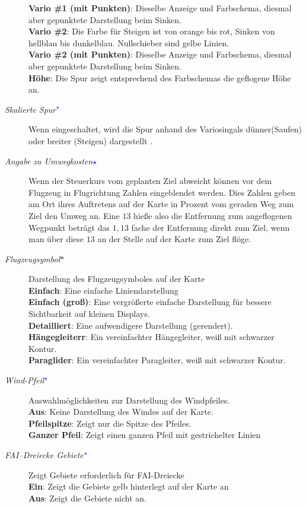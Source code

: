 \begin{description}
  {\bf Vario \#1 (mit Punkten)}: Dieselbe Anzeige und Farbschema, diesmal aber gepunktete Darstellung
beim Sinken. \\
  {\bf Vario \#2}: Die Farbe für Steigen ist von orange bis rot, Sinken von hellblau bis dunkelblau. Nullschieber sind gelbe Linien.\\
  {\bf Vario \#2 (mit Punkten)}: Dieselbe Anzeige und Farbschema, diesmal aber gepunktete Darstellung
  beim Sinken.\\
  {\bf Höhe}: Die Spur zeigt entsprechend des Farbschemas die geflogene Höhe an.
\item[\textit{Skalierte Spur$^{\textcolor{blue}{\star}}$}] \label{conf:trailscaled} Wenn eingeschaltet, wird die Spur anhand des Variosingals
dünner(Saufen) oder breiter (Steigen) dargestellt .
\item[\textit{Angabe zu Umwegkosten\textcolor{blue}{$\star$}}]  Wenn der Steuerkurs vom geplanten Ziel abweicht können vor dem
Flugzeug in Flugrichtung Zahlen eingeblendet werden. Dies Zahlen geben am Ort ihres Auftretens auf der Karte
in Prozent vom geraden Weg zum Ziel den Umweg an. Eine $13$ hieße also die Entfernung zum angeflogenen
Wegpunkt beträgt das $1,13$ fache der Entfernung direkt zum Ziel, wenn man über diese $13$
an der Stelle auf der Karte zum Ziel flöge.
\item[\textit{Flugzeugsymbol$\ast$}]  Darstellung des Flugzeugsymboles auf der Karte \\
  {\bf Einfach}: Eine einfache Liniendarstellung \\
  {\bf Einfach (groß)}: Eine vergrößerte einfache Darstellung für bessere Sichtbarkeit auf kleinen Displays. \\
  {\bf Detailliert}: Eine aufwendigere Darstellung (gerendert). \\
  {\bf Hängegleiterr}: Ein vereinfachter Hängegleiter, weiß mit schwarzer Kontur. \\
  {\bf Paraglider}: Ein vereinfachter Paragleiter, weiß mit schwarzer Kontur.
\item[\textit{Wind-Pfeil$^{\textcolor{blue}{\star}}$}]  Auswahlmöglichkeiten zur Darstellung des Windpfeiles.\\
  {\bf Aus}: Keine Darstellung des Windes auf der Karte. \\
  {\bf Pfeilspitze}: Zeigt  nur die Spitze des Pfeiles. \\
  {\bf Ganzer Pfeil}: Zeigt einen ganzen Pfeil mit gestrichelter Linien
\item[\textit{FAI--Dreiecke Gebiete$^{\textcolor{blue}{\star}}$}]  Zeigt Gebiete erforderlich für FAI-Dreiecke  \\
  {\bf Ein}:  Zeigt die Gebiete gelb hinterlegt auf der Karte an \\
  {\bf Aus}: Zeigt die Gebiete nicht an.
  \end{description}


